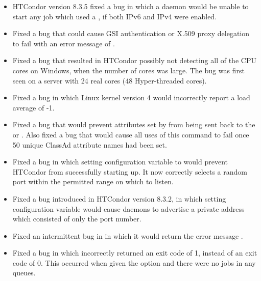 \begin{itemize}

\item HTCondor version 8.3.5 fixed a bug in which 
a  daemon would be unable to start
any job which used a , if both IPv6 and IPv4 were enabled.

\item Fixed a bug that could cause GSI authentication or X.509 proxy
delegation to fail with an error message of
.

\item Fixed a bug that resulted in HTCondor possibly not detecting all of 
the CPU cores on Windows, when the number of cores was large. 
The bug was first seen on a server with 24 real cores (48 Hyper-threaded cores).

\item Fixed a bug in which Linux kernel version 4 would incorrectly report
a load average of -1.

\item Fixed a bug that would prevent attributes set by 
 
from being sent back to the  or . 
Also fixed a bug that would cause all uses of this  command 
to fail once 50 unique ClassAd attribute names had been set.

\item Fixed a bug in which setting configuration variable
 to 
would prevent HTCondor from successfully starting up.  
It now correctly
selects a random port within the permitted range on which to listen.

\item Fixed a bug introduced in HTCondor version 8.3.2,
in which setting configuration variable
 would cause daemons to advertise a private
address which consisted of only the port number.

\item Fixed an intermittent bug in   in which it would
return the error message .

\item Fixed a bug in which  incorrectly returned an exit code of 1,
instead of an exit code of 0.
This occurred when given the  option 
and there were no jobs in any queues.


\end{itemize}
